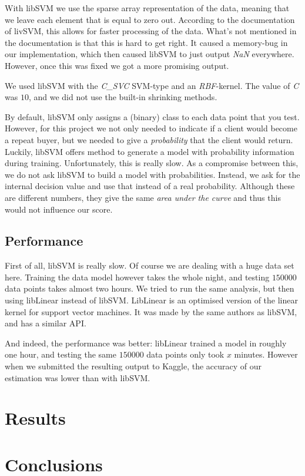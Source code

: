 \documentclass[a4paper]{article}
\begin{document}
With libSVM we use the sparse array representation of the data, meaning that we leave each element that is equal to zero out. According to the documentation of livSVM, this allows for faster processing of the data. What's not mentioned in the documentation is that this is hard to get right. It caused a memory-bug in our implementation, which then caused libSVM to just output \emph{NaN} everywhere. However, once this was fixed we got a more promising output.

We used libSVM with the \emph{C\_SVC} SVM-type and an \emph{RBF}-kernel. The value of \emph{C} was $10$, and we did not use the built-in shrinking methods.

By default, libSVM only assigns a (binary) class to each data point that you test. However, for this project we not only needed to indicate if a client would become a repeat buyer, but we needed to give a \emph{probability} that the client would return. Luckily, libSVM offers method to generate a model with probability information during training. Unfortunately, this is really slow. As a compromise between this, we do not ask libSVM to build a model with probabilities. Instead, we ask for the internal decision value and use that instead of a real probability. Although these are different numbers, they give the same \emph{area under the curve} and thus this would not influence our score.

\subsection{Performance}
First of all, libSVM is really slow. Of course we are dealing with a huge data set here. Training the data model however takes the whole night, and testing $150000$ data points takes almost two hours. We tried to run the same analysis, but then using libLinear instead of libSVM. LibLinear is an optimised version of the linear kernel for support vector machines. It was made by the same authors as libSVM, and has a similar API.

And indeed, the performance was better: libLinear trained a model in roughly one hour, and testing the same $150000$ data points only took $x$ minutes. However when we submitted the resulting output to Kaggle, the accuracy of our estimation was lower than with libSVM.

\section{Results}


\section{Conclusions}
\end{document}
